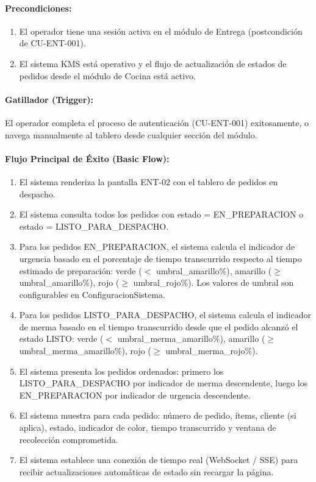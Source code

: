 \paragraph{Precondiciones:}
\begin{enumerate}
    \item[I.] El operador tiene una sesión activa en el módulo de Entrega (postcondición de CU-ENT-001).
    \item[II.] El sistema KMS está operativo y el flujo de actualización de estados de pedidos desde el módulo de Cocina está activo.
\end{enumerate}

\paragraph{Gatillador (Trigger):} El operador completa el proceso de autenticación (CU-ENT-001) exitosamente, o navega manualmente al tablero desde cualquier sección del módulo.

\paragraph{Flujo Principal de Éxito (Basic Flow):}
\begin{enumerate}
    \item[I.] El sistema renderiza la pantalla ENT-02 con el tablero de pedidos en despacho.
    \item[II.] El sistema consulta todos los pedidos con estado = EN\_PREPARACION o estado = LISTO\_PARA\_DESPACHO.
    \item[III.] Para los pedidos EN\_PREPARACION, el sistema calcula el indicador de urgencia basado en el porcentaje de tiempo transcurrido respecto al tiempo estimado de preparación: verde ($<$ umbral\_amarillo\%), amarillo ($\ge$ umbral\_amarillo\%), rojo ($\ge$ umbral\_rojo\%). Los valores de umbral son configurables en ConfiguracionSistema.
    \item[IV.] Para los pedidos LISTO\_PARA\_DESPACHO, el sistema calcula el indicador de merma basado en el tiempo transcurrido desde que el pedido alcanzó el estado LISTO: verde ($<$ umbral\_merma\_amarillo\%), amarillo ($\ge$ umbral\_merma\_amarillo\%), rojo ($\ge$ umbral\_merma\_rojo\%).
    \item[V.] El sistema presenta los pedidos ordenados: primero los LISTO\_PARA\_DESPACHO por indicador de merma descendente, luego los EN\_PREPARACION por indicador de urgencia descendente.
    \item[VI.] El sistema muestra para cada pedido: número de pedido, ítems, cliente (si aplica), estado, indicador de color, tiempo transcurrido y ventana de recolección comprometida.
    \item[VII.] El sistema establece una conexión de tiempo real (WebSocket / SSE) para recibir actualizaciones automáticas de estado sin recargar la página.
\end{enumerate}

